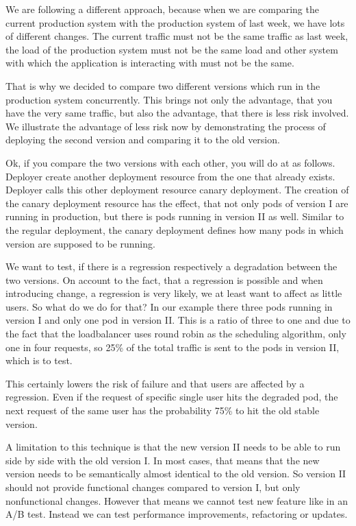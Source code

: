 We are following a different approach, because when we are comparing the current
production system with the production system of last week, we have lots of different
changes. The current traffic must not be the same traffic as last week, the load of the
production system must not be the same load and other system with which the application is
interacting with must not be the same.

That is why we decided to compare two different versions which run in the production
system concurrently. This brings not only the advantage, that you have the very same
traffic, but also the advantage, that there is less risk involved. We illustrate the
advantage of less risk now by demonstrating the process of deploying the second version
and comparing it to the old version.

Ok, if you compare the two versions with each other, you will do at as follows. Deployer
create another deployment resource from the one that already exists. Deployer calls this
other deployment resource canary deployment. The creation of the canary deployment
resource has the effect, that not only pods of version I are running in production, but
there is pods running in version II as well. Similar to the regular deployment, the canary
deployment defines how many pods in which version are supposed to be running.

We want to test, if there is a regression respectively a degradation between the two
versions. On account to the fact, that a regression is possible and when introducing
change, a regression is very likely, we at least want to affect as little users. So what
do we do for that? In our example there three pods running in version I and only one pod
in version II. This is a ratio of three to one and due to the fact that the loadbalancer
uses round robin as the scheduling algorithm, only one in four requests, so 25\% of the
total traffic is sent to the pods in version II, which is to test.

This certainly lowers the risk of failure and that users are affected by a
regression. Even if the request of specific single user hits the degraded pod, the next
request of the same user has the probability 75\% to hit the old stable version.

A limitation to this technique is that the new version II needs to be able to run side by
side with the old version I. In most cases, that means that the new version needs to be
semantically almost identical to the old version. So version II should not provide
functional changes compared to version I, but only nonfunctional changes. However that
means we cannot test new feature like in an A/B test. Instead we can test performance
improvements, refactoring or updates.

